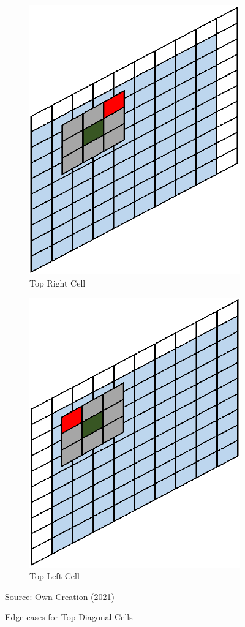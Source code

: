 \begin{figure}[H]
\centering
\begin{subfigure}{.4\textwidth}
  \centering
  \includegraphics[width=.5\linewidth]{Figures/Chapter3/topright}
  \caption{Top Right Cell}
\end{subfigure}%
\begin{subfigure}{.4\textwidth}
  \centering
  \includegraphics[width=.5\linewidth]{Figures/Chapter3/topleft}
  \caption{Top Left Cell}
\end{subfigure}
\caption{Edge cases for Top Diagonal Cells}
\begin{center}
Source: Own Creation (2021)
\end{center}
\label{fig:e2}
\end{figure}

